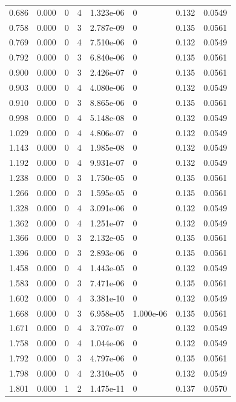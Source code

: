 \documentclass[preview]{standalone}
\begin{document}
{{\begin{tabular}{L{1.2cm}C{1.2cm} C{0.3cm}C{0.5cm} C{1.4cm}C{1.4cm} C{1.4cm}C{1.4cm}}
  0.686  &  0.000  & 0     &  4 &  1.323e-06  & 0  & 0.132 &  0.0549   \\ 
  0.758  &  0.000  & 0     &  3 &  2.787e-09  & 0  & 0.135 &  0.0561   \\ 
  0.769  &  0.000  & 0     &  4 &  7.510e-06  & 0  & 0.132 &  0.0549   \\ 
  0.792  &  0.000  & 0     &  3 &  6.840e-06  & 0  & 0.135 &  0.0561   \\ 
  0.900  &  0.000  & 0     &  3 &  2.426e-07  & 0  & 0.135 &  0.0561   \\ 
  0.903  &  0.000  & 0     &  4 &  4.080e-06  & 0  & 0.132 &  0.0549   \\ 
  0.910  &  0.000  & 0     &  3 &  8.865e-06  & 0  & 0.135 &  0.0561   \\ 
  0.998  &  0.000  & 0     &  4 &  5.148e-08  & 0  & 0.132 &  0.0549   \\ 
  1.029  &  0.000  & 0     &  4 &  4.806e-07  & 0  & 0.132 &  0.0549   \\ 
  1.143  &  0.000  & 0     &  4 &  1.985e-08  & 0  & 0.132 &  0.0549   \\ 
  1.192  &  0.000  & 0     &  4 &  9.931e-07  & 0  & 0.132 &  0.0549   \\ 
  1.238  &  0.000  & 0     &  3 &  1.750e-05  & 0  & 0.135 &  0.0561   \\ 
  1.266  &  0.000  & 0     &  3 &  1.595e-05  & 0  & 0.135 &  0.0561   \\ 
  1.328  &  0.000  & 0     &  4 &  3.091e-06  & 0  & 0.132 &  0.0549   \\ 
  1.362  &  0.000  & 0     &  4 &  1.251e-07  & 0  & 0.132 &  0.0549   \\ 
  1.366  &  0.000  & 0     &  3 &  2.132e-05  & 0  & 0.135 &  0.0561   \\ 
  1.396  &  0.000  & 0     &  3 &  2.893e-06  & 0  & 0.135 &  0.0561   \\ 
  1.458  &  0.000  & 0     &  4 &  1.443e-05  & 0  & 0.132 &  0.0549   \\ 
  1.583  &  0.000  & 0     &  3 &  7.471e-06  & 0  & 0.135 &  0.0561   \\ 
  1.602  &  0.000  & 0     &  4 &  3.381e-10  & 0  & 0.132 &  0.0549   \\ 
  1.668  &  0.000  & 0     &  3 &  6.958e-05  & 1.000e-06  & 0.135 &  0.0561   \\ 
  1.671  &  0.000  & 0     &  4 &  3.707e-07  & 0  & 0.132 &  0.0549   \\ 
  1.758  &  0.000  & 0     &  4 &  1.044e-06  & 0  & 0.132 &  0.0549   \\ 
  1.792  &  0.000  & 0     &  3 &  4.797e-06  & 0  & 0.135 &  0.0561   \\ 
  1.798  &  0.000  & 0     &  4 &  2.310e-05  & 0  & 0.132 &  0.0549   \\ 
  1.801  &  0.000  & 1     &  2 &  1.475e-11  & 0  & 0.137 &  0.0570   \\ 
\hline 
\end{tabular} 

}}
\end{document}
